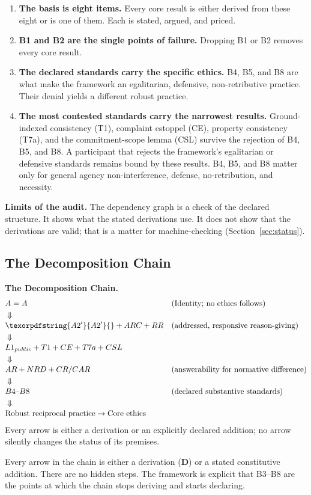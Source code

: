 \documentclass[11pt]{article}
\def\ensuremath#1{#1}%
\def\mathrm#1{#1}%
\newcommand{\statusD}{\textcolor{stD}{\textbf{D}}}
\newcommand{\Atwo}{\texorpdfstring{\ensuremath{\mathrm{A2}'}}{A2'}}
\begin{document}
\begin{enumerate}
\item \textbf{The basis is eight items.} Every core result is either derived from these eight or is one of them. Each is stated, argued, and priced.
\item \textbf{B1 and B2 are the single points of failure.} Dropping B1 or B2 removes every core result.
\item \textbf{The declared standards carry the specific ethics.} B4, B5, and B8 are what make the framework an egalitarian, defensive, non-retributive practice. Their denial yields a different robust practice.
\item \textbf{The most contested standards carry the narrowest results.} Ground-indexed consistency (T1), complaint estoppel (CE), property consistency (T7a), and the commitment-scope lemma (CSL) survive the rejection of B4, B5, and B8. A participant that rejects the framework's egalitarian or defensive standards remains bound by these results. B4, B5, and B8 matter only for general agency non-interference, defense, no-retribution, and necessity.
\end{enumerate}
\textbf{Limits of the audit.} The dependency graph is a check of the declared structure. It shows what the stated derivations use. It does not show that the derivations are valid; that is a matter for machine-checking (Section~\ref{sec:status}).

\newpage
\subsection{The Decomposition Chain}
\begin{paperbox}
\textbf{The Decomposition Chain.}
\[
\begin{aligned}
&A=A &&\text{(Identity; no ethics follows)}\\
&\Downarrow\\[-0.2em]
&\Atwo{}+\mathrm{ARC}+\mathrm{RR} &&\text{(addressed, responsive reason-giving)}\\
&\Downarrow\\[-0.2em]
&\mathrm{L1}_{\mathrm{public}}+\mathrm{T1}+\mathrm{CE}+\mathrm{T7a}+\mathrm{CSL}\\
&\Downarrow\\[-0.2em]
&\mathrm{AR}+\mathrm{NRD}+\mathrm{CR/CAR} &&\text{(answerability for normative difference)}\\
&\Downarrow\\[-0.2em]
&\mathrm{B4\text{--}B8} &&\text{(declared substantive standards)}\\
&\Downarrow\\[-0.2em]
&\text{Robust reciprocal practice}\rightarrow\text{Core ethics}
\end{aligned}
\]
Every arrow is either a derivation or an explicitly declared addition; no arrow silently changes the status of its premises.
\end{paperbox}
Every arrow in the chain is either a derivation (\statusD{}) or a stated constitutive addition. There are no hidden steps. The framework is explicit that B3--B8 are the points at which the chain stops deriving and starts declaring.
\end{document}
